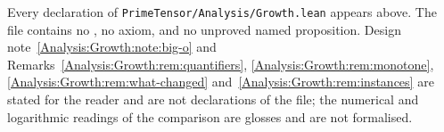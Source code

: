 \noindent
Every declaration of \texttt{PrimeTensor/Analysis/Growth.lean} appears above.
The file contains no , no axiom, and no unproved named proposition.
Design note~\ref{Analysis:Growth:note:big-o} and
Remarks~\ref{Analysis:Growth:rem:quantifiers},
\ref{Analysis:Growth:rem:monotone}, \ref{Analysis:Growth:rem:what-changed}
and~\ref{Analysis:Growth:rem:instances} are stated for the reader and are not
declarations of the file; the numerical and logarithmic readings of the
comparison are glosses and are not formalised.
